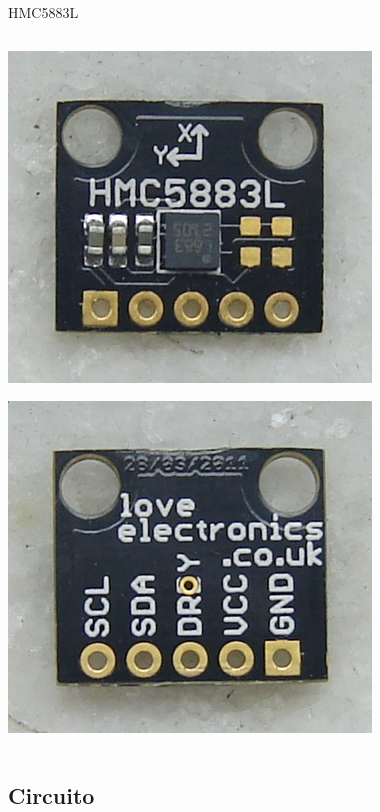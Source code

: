 \documentclass{beamer}
\begin{document}
\begin{frame}[label=fotos-sensor]{HMC5883L}
\begin{columns}
		\begin{center}
			\includegraphics[height=0.4\textheight]{../monografia/img/sensor_other_pcb_front.jpg}

			\includegraphics[height=0.4\textheight]{../monografia/img/sensor_other_pcb_back.jpg}
		\end{center}
	\end{columns}
\end{frame}


\subsection{Circuito}
\end{document}

